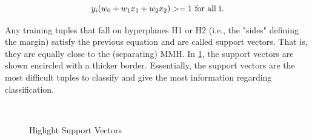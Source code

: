 \begin{dBox}
\begin{equation}
y_{i}(w_0 + w_1 x_1 + w_2 x_2) >= 1 $ for all i$. 
\end{equation}
\end{dBox}
\bigskip
Any training tuples that fall on hyperplanes H1 or H2 (i.e., the "sides" defining the margin) satisfy the previous equation and are called support vectors. That is, they are equally close to the (separating) MMH. In \ref{fig:svm3}, the support vectors are shown encircled with a thicker border. Essentially, the support vectors are the most difficult tuples to classify and give the most information regarding classification.\bigskip
\bigskip
\begin{figure}[h]
\begin{dBox}
\centering
  \mbox{
   }
   \caption{Higlight Support Vectors \cite{classifications}\label{fig:svm3} }   
\end{dBox}   
\end{figure}

